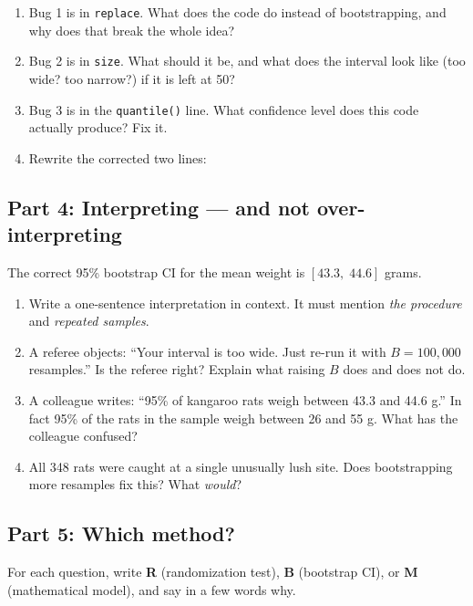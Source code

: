 \documentclass{article}
\begin{document}
\begin{enumerate}[label={\bfseries (\Alph*)},itemsep=.8em]
\item Bug 1 is in \texttt{replace}. What does the code do instead of bootstrapping, and why does that break the whole idea? \\[4em]
\item Bug 2 is in \texttt{size}. What should it be, and what does the interval look like (too wide? too narrow?) if it is left at 50? \\[4em]
\item Bug 3 is in the \texttt{quantile()} line. What confidence level does this code actually produce? Fix it. \\[3.5em]
\item Rewrite the corrected two lines: \\[5em]
\end{enumerate}

\subsection*{Part 4: Interpreting --- and not over-interpreting}
The correct 95\% bootstrap CI for the mean weight is $[43.3,\;44.6]$ grams.

\begin{enumerate}[label={\bfseries (\Alph*)},itemsep=.8em]
\item Write a one-sentence interpretation in context. It must mention \emph{the procedure} and \emph{repeated samples}. \\[4em]
\item A referee objects: ``Your interval is too wide. Just re-run it with $B = 100{,}000$ resamples.'' Is the referee right? Explain what raising $B$ does and does not do. \\[4em]
\item A colleague writes: ``95\% of kangaroo rats weigh between 43.3 and 44.6 g.'' In fact 95\% of the rats in the sample weigh between 26 and 55 g. What has the colleague confused? \\[4em]
\item All 348 rats were caught at a single unusually lush site. Does bootstrapping more resamples fix this? What \emph{would}? \\[4em]
\end{enumerate}

\subsection*{Part 5: Which method?}
For each question, write \textbf{R} (randomization test), \textbf{B} (bootstrap CI), or \textbf{M} (mathematical model), and say in a few words why.
\end{document}
